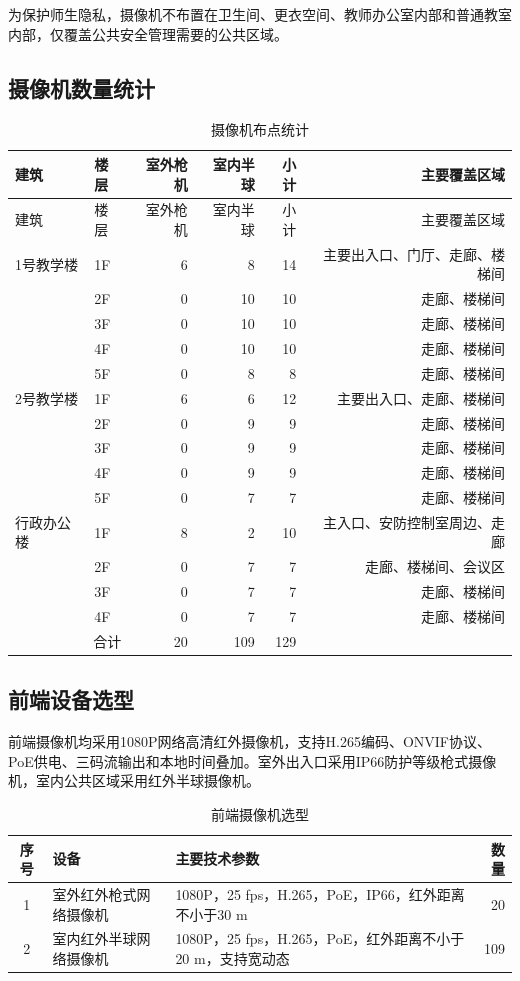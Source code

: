 \documentclass[UTF8,zihao=-4,openany]{ctexrep}
\begin{document}
为保护师生隐私，摄像机不布置在卫生间、更衣空间、教师办公室内部和普通教室内部，仅覆盖公共安全管理需要的公共区域。

\subsection{摄像机数量统计}
\begin{longtable}{llrrrr}
\caption{摄像机布点统计}\label{tab:camera}\\
\toprule
建筑&楼层&室外枪机&室内半球&小计&主要覆盖区域\\
\midrule
\endfirsthead
\toprule
建筑&楼层&室外枪机&室内半球&小计&主要覆盖区域\\
\midrule
\endhead
1号教学楼&1F&6&8&14&主要出入口、门厅、走廊、楼梯间\\
&2F&0&10&10&走廊、楼梯间\\
&3F&0&10&10&走廊、楼梯间\\
&4F&0&10&10&走廊、楼梯间\\
&5F&0&8&8&走廊、楼梯间\\
\midrule
2号教学楼&1F&6&6&12&主要出入口、走廊、楼梯间\\
&2F&0&9&9&走廊、楼梯间\\
&3F&0&9&9&走廊、楼梯间\\
&4F&0&9&9&走廊、楼梯间\\
&5F&0&7&7&走廊、楼梯间\\
\midrule
行政办公楼&1F&8&2&10&主入口、安防控制室周边、走廊\\
&2F&0&7&7&走廊、楼梯间、会议区\\
&3F&0&7&7&走廊、楼梯间\\
&4F&0&7&7&走廊、楼梯间\\
\midrule
\multicolumn{2}{r}{合计}&20&109&129&\\
\bottomrule
\end{longtable}

\subsection{前端设备选型}
前端摄像机均采用1080P网络高清红外摄像机，支持H.265编码、ONVIF协议、PoE供电、三码流输出和本地时间叠加。室外出入口采用IP66防护等级枪式摄像机，室内公共区域采用红外半球摄像机。

\begin{table}[H]
\centering
\caption{前端摄像机选型}
\begin{tabularx}{\textwidth}{clXr}
\toprule
序号&设备&主要技术参数&数量\\
\midrule
1&室外红外枪式网络摄像机&1080P，25 fps，H.265，PoE，IP66，红外距离不小于30 m&20\\
2&室内红外半球网络摄像机&1080P，25 fps，H.265，PoE，红外距离不小于20 m，支持宽动态&109\\
\bottomrule
\end{tabularx}
\end{table}
\end{document}
